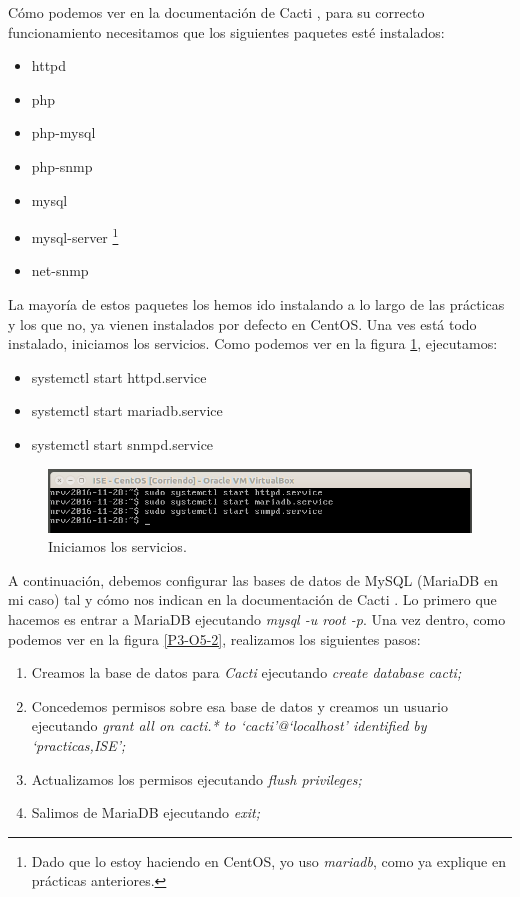\documentclass[a4paper,titlepage,12pt]{report}	%
\numberwithin{figure}{section} %
\numberwithin{table}{section} %
\begin{document}
	Cómo podemos ver en la  documentación de Cacti \cite{cacti_paquetes}, para su correcto funcionamiento necesitamos que los siguientes paquetes esté instalados:
	\begin{itemize}
	   \item httpd
	   \item php
	   \item php-mysql
	   \item php-snmp
	   \item mysql
	   \item mysql-server \footnote{Dado que lo estoy haciendo en CentOS, yo uso \textit{mariadb}, como ya explique en prácticas anteriores.}
	   \item net-snmp
	\end{itemize}

	La mayoría de estos paquetes los hemos ido instalando a lo largo de las prácticas y los que no, ya vienen instalados por defecto en CentOS. Una ves está todo instalado, iniciamos los servicios. Como podemos ver en la figura \ref{P3-O5-1}, ejecutamos:
	\begin{itemize}
	   \item systemctl start httpd.service
	   \item systemctl start mariadb.service
	   \item systemctl start snmpd.service
	\end{itemize}

	\begin{figure}[H]
	   \includegraphics[width=\linewidth]{./Imagenes/P3/O5-1.png}
	   \vspace{-0.5cm}
	   \caption[Iniciamos los servicios.]{Iniciamos los servicios.}
	   \label{P3-O5-1}
	\end{figure}

	A continuación, debemos configurar las bases de datos de MySQL (MariaDB en mi caso) tal y cómo nos indican en la documentación de Cacti \cite{cacti_mysql}. Lo primero que hacemos es entrar a MariaDB ejecutando \textit{mysql -u root -p}. Una vez dentro, como podemos ver en la figura \ref{P3-O5-2}, realizamos los siguientes pasos:
	\begin{enumerate}
	   \item Creamos la base de datos para \textit{Cacti} ejecutando \textit{create database cacti;}
	   \item Concedemos permisos sobre esa base de datos y creamos un usuario ejecutando \textit{grant all on cacti.* to `cacti'@`localhost' identified by `practicas,ISE';}
	   \item Actualizamos los permisos ejecutando \textit{flush privileges;}
	   \item Salimos de MariaDB ejecutando \textit{exit;}
	\end{enumerate}
\end{document}
